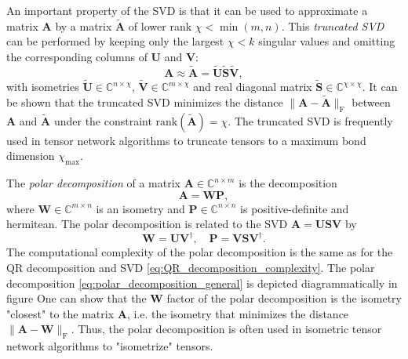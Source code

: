 An important property of the SVD is that it can be used to approximate a matrix $\bm{A}$ by a matrix $\tilde{\bm{A}}$ of lower rank $\chi < \min(m, n)$. This \textit{truncated SVD} can be performed by keeping only the largest $\chi < k$ singular values and omitting the corresponding columns of $\bm{U}$ and $\bm{V}$:
\begin{equation}
	\label{eq:truncated_SVD_general}
	\bm{A} \approx \tilde{\bm{A}} = \tilde{\bm{U}}\tilde{\bm{S}}\tilde{\bm{V}},
\end{equation}
with isometries $\tilde{\bm{U}}\in\mathbb{C}^{n\times\chi}$, $\tilde{\bm{V}}\in\mathbb{C}^{m\times\chi}$ and real diagonal matrix $\tilde{\bm{S}}\in\mathbb{C}^{\chi\times\chi}$. It can be shown \cite{cite:eckart_young_theorem} that the truncated SVD minimizes the distance $\lVert \bm{A} - \bm{\tilde{A}} \rVert_\text{F}$ between $\bm{A}$ and $\tilde{\bm{A}}$ under the constraint $\text{rank}(\tilde{\bm{A}}) = \chi$. The truncated SVD is frequently used in tensor network algorithms to truncate tensors to a maximum bond dimension $\chi_\text{max}$. \par
The \textit{polar decomposition} of a matrix $\bm{A} \in \mathbb{C}^{n\times m}$ is the decomposition
\begin{equation}
	\label{eq:polar_decomposition_general}
	\bm{A} = \bm{W}\bm{P},
\end{equation}
where $\bm{W}\in\mathbb{C}^{m\times n}$ is an isometry and $\bm{P}\in\mathbb{C}^{n\times n}$ is positive-definite and hermitean. The polar decomposition is related to the SVD $\bm{A} = \bm{U}\bm{S}\bm{V}$ by
\begin{equation}
	\label{eq:polar_decomposition_connection_to_svd}
	\bm{W} = \bm{U}\bm{V}^\dagger, \quad \bm{P} = \bm{V}\bm{S}\bm{V}^\dagger.
\end{equation}
The computational complexity of the polar decomposition is the same as for the QR decomposition and SVD \eqref{eq:QR_decomposition_complexity}. The polar decomposition \eqref{eq:polar_decomposition_general} is depicted diagrammatically in figure  One can show  that the $\bm{W}$ factor of the polar decomposition is the isometry "closest" to the matrix $\bm{A}$, i.e. the isometry that minimizes the distance $\lVert\bm{A}-\bm{W}\rVert_\text{F}$. Thus, the polar decomposition is often used in isometric tensor network algorithms to "isometrize" tensors.
